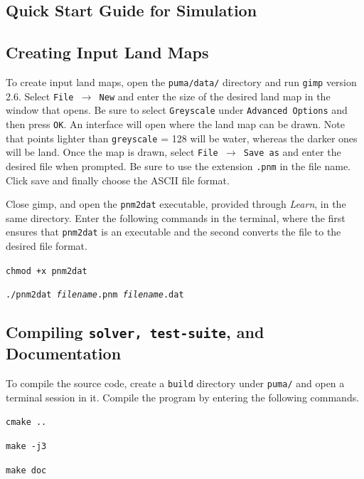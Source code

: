 \documentclass[a4paper,11pt]{article}
\begin{document}
\newpage
\begin{appendices}
\section{Quick Start Guide for Simulation }
\subsection{Creating Input Land Maps}

To create input land maps, open the \texttt{puma/data/} directory and run \texttt{gimp} version 2.6. Select \texttt{File $\rightarrow$ New} and enter the size of the desired land map in the window that opens.  Be sure to select \texttt{Greyscale} under \texttt{Advanced Options} and then press \texttt{OK}. An interface will open where the land map can be drawn. Note that points lighter than \texttt{greyscale} = 128 will be water, whereas the darker ones will be land. Once the map is drawn, select \texttt{File $\rightarrow$ Save as} and enter the desired file when prompted.  Be sure to use the extension \texttt{.pnm} in the file name.  Click save and finally choose the ASCII file format.

Close gimp, and open the \texttt{pnm2dat} executable, provided through \textit{Learn}, in the same directory. Enter the following commands in the terminal, where the first ensures that \texttt{pnm2dat} is an executable and the second converts the file to the desired file format. 

\vspace{5pt}
\noindent \texttt{chmod +x pnm2dat}

\noindent \texttt{./pnm2dat \emph{filename}.pnm  \emph{filename}.dat}
\vspace{5pt}

\subsection{Compiling \texttt{solver, test-suite}, and Documentation}

To compile the source code, create a \texttt{build} directory under \texttt{puma/} and open a terminal session in it. Compile the program by entering the following commands.

\vspace{5pt}
\noindent \texttt{cmake ..}

\noindent \texttt{make -j3}

\noindent\texttt{make doc}
\vspace{5pt}


\end{appendices}
\end{document}
